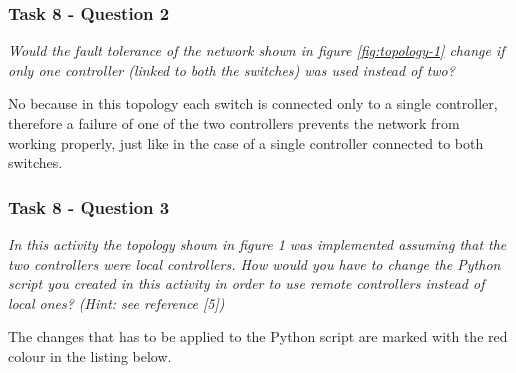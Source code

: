 \subsubsection*{Task 8 - Question 2}
\textit{Would the fault tolerance of the network shown in figure \ref{fig:topology-1}
change if only one controller (linked to both the switches) was used
instead of two?}

No because in this topology each switch is connected only to a single controller,
therefore a failure of one of the two controllers prevents the network from
working properly, just like in the case of a single controller connected to both switches.





\subsubsection*{Task 8 - Question 3}
\textit{In this activity the topology shown in figure 1 was implemented
assuming that the two controllers were local controllers. How
would you have to change the Python script you created in this
activity in order to use remote controllers instead of local ones?
(Hint: see reference [5])}

The changes that has to be applied to the Python script are marked with the red
colour in the listing below.

